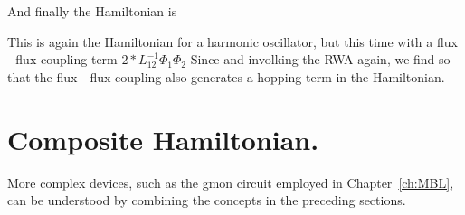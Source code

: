 And finally the Hamiltonian is

This is again the Hamiltonian for a harmonic oscillator, but this time with a flux - flux coupling term $2 * L^{-1}_{12} \Phi_1 \Phi_2$
Since  and involking the RWA again, we find
so that the flux - flux coupling also generates a hopping term in the Hamiltonian.

\section{Composite Hamiltonian.}

More complex devices, such as the gmon circuit employed in Chapter~\ref{ch:MBL}, can be understood by combining the concepts in the preceding sections.


